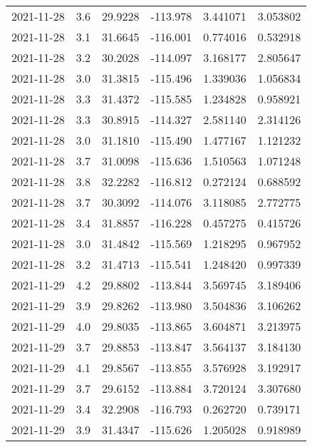 \begin{tabular}{lrrrrr}
2021-11-28 &       3.6 &  29.9228 &  -113.978 &         3.441071 &         3.053802 \\
2021-11-28 &       3.1 &  31.6645 &  -116.001 &         0.774016 &         0.532918 \\
2021-11-28 &       3.2 &  30.2028 &  -114.097 &         3.168177 &         2.805647 \\
2021-11-28 &       3.0 &  31.3815 &  -115.496 &         1.339036 &         1.056834 \\
2021-11-28 &       3.3 &  31.4372 &  -115.585 &         1.234828 &         0.958921 \\
2021-11-28 &       3.3 &  30.8915 &  -114.327 &         2.581140 &         2.314126 \\
2021-11-28 &       3.0 &  31.1810 &  -115.490 &         1.477167 &         1.121232 \\
2021-11-28 &       3.7 &  31.0098 &  -115.636 &         1.510563 &         1.071248 \\
2021-11-28 &       3.8 &  32.2282 &  -116.812 &         0.272124 &         0.688592 \\
2021-11-28 &       3.7 &  30.3092 &  -114.076 &         3.118085 &         2.772775 \\
2021-11-28 &       3.4 &  31.8857 &  -116.228 &         0.457275 &         0.415726 \\
2021-11-28 &       3.0 &  31.4842 &  -115.569 &         1.218295 &         0.967952 \\
2021-11-28 &       3.2 &  31.4713 &  -115.541 &         1.248420 &         0.997339 \\
2021-11-29 &       4.2 &  29.8802 &  -113.844 &         3.569745 &         3.189406 \\
2021-11-29 &       3.9 &  29.8262 &  -113.980 &         3.504836 &         3.106262 \\
2021-11-29 &       4.0 &  29.8035 &  -113.865 &         3.604871 &         3.213975 \\
2021-11-29 &       3.7 &  29.8853 &  -113.847 &         3.564137 &         3.184130 \\
2021-11-29 &       4.1 &  29.8567 &  -113.855 &         3.576928 &         3.192917 \\
2021-11-29 &       3.7 &  29.6152 &  -113.884 &         3.720124 &         3.307680 \\
2021-11-29 &       3.4 &  32.2908 &  -116.793 &         0.262720 &         0.739171 \\
2021-11-29 &       3.9 &  31.4347 &  -115.626 &         1.205028 &         0.918989 \\

\end{tabular}

